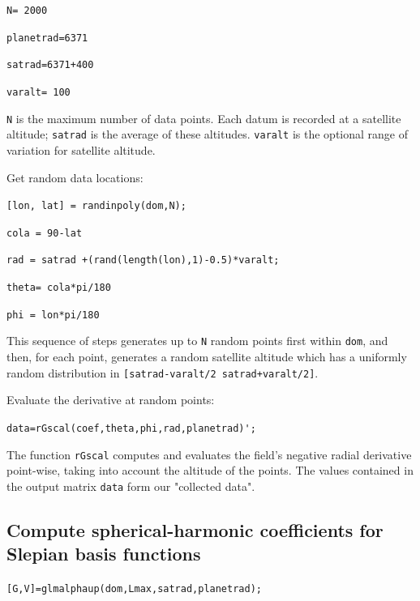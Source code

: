 \documentclass{article}
\begin{document}
\verb!N= 2000 ! 

\verb!planetrad=6371!

\verb!satrad=6371+400!

\verb!varalt= 100!

\setlength{\parskip}{0.5cm plus4mm minus3mm}

\verb!N! is the maximum number of data points. Each datum is recorded at a satellite altitude; \verb!satrad! is the average of these altitudes.  \verb!varalt! is the optional range of variation for satellite altitude.

\vspace{3mm}

Get random data locations:

\vspace{3mm}

\setlength{\parskip}{.1mm}

\verb![lon, lat] = randinpoly(dom,N);!

\verb!cola = 90-lat!

\verb!rad = satrad +(rand(length(lon),1)-0.5)*varalt;!

\verb!theta= cola*pi/180!

\verb!phi = lon*pi/180!

\setlength{\parskip}{0.5cm plus4mm minus3mm}

This sequence of steps generates up to \verb!N! random points first within \verb!dom!, and then, for each point, generates a random satellite altitude which has a uniformly random distribution in  \verb![satrad-varalt/2 satrad+varalt/2]!.

\vspace{3mm}

Evaluate the derivative at random points:

\verb!data=rGscal(coef,theta,phi,rad,planetrad)';!

\setlength{\parskip}{0.5cm plus4mm minus3mm}

The function \verb!rGscal! computes and evaluates the field's negative radial derivative point-wise, taking into account the altitude of the points. The values contained in the output matrix \verb!data! form our "collected data".


\subsection{Compute spherical-harmonic coefficients for Slepian basis functions}


\verb![G,V]=glmalphaup(dom,Lmax,satrad,planetrad);!
\end{document}
